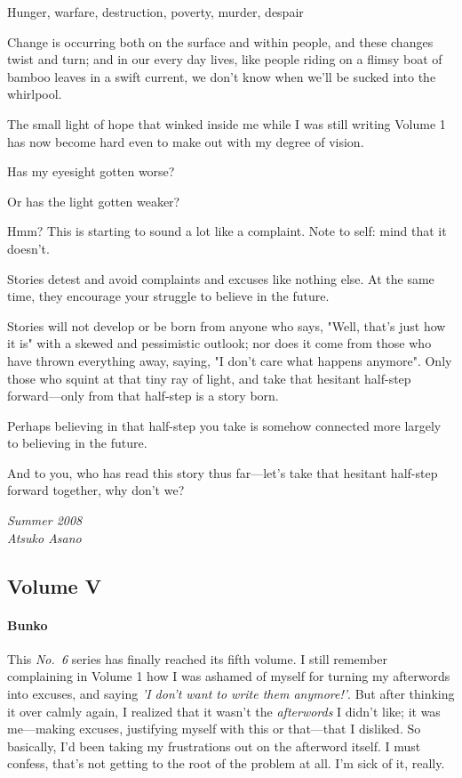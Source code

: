 Hunger, warfare, destruction, poverty, murder, despair\el 

Change is occurring both on the surface and within people, and these
changes twist and turn; and in our every day lives, like people riding
on a flimsy boat of bamboo leaves in a swift current, we don't know when
we'll be sucked into the whirlpool.

The small light of hope that winked inside me while I was still writing
Volume 1 has now become hard even to make out with my degree of vision.

Has my eyesight gotten worse?

Or has the light gotten weaker?

Hmm? This is starting to sound a lot like a complaint. Note to self:
mind that it doesn't.

Stories detest and avoid complaints and excuses like nothing else. At
the same time, they encourage your struggle to believe in the future.

Stories will not develop or be born from anyone who says, "Well, that's
just how it is" with a skewed and pessimistic outlook; nor does it come
from those who have thrown everything away, saying, "I don't care what
happens anymore". Only those who squint at that tiny ray of light, and
take that hesitant half-step forward---only from that half-step is a story
born.

Perhaps believing in that half-step you take is somehow connected more
largely to believing in the future.

And to you, who has read this story thus far---let's take that hesitant
half-step forward together, why don't we?

\myspace

\emph{Summer 2008\\
	Atsuko Asano}

\clearpage
\subsection{Volume V}
\paragraph{Bunko}

This \emph{No.~6} series has finally reached its fifth volume. I still remember
complaining in Volume 1 how I was ashamed of myself for turning my
afterwords into excuses, and saying \emph{'I don't want to write them
anymore!'}. But after thinking it over calmly again, I realized that it
wasn't the \emph{afterwords} I didn't like; it was me---making excuses,
justifying myself with this or that---that I disliked. So basically, I'd
been taking my frustrations out on the afterword itself. I must confess,
that's not getting to the root of the problem at all. I'm sick of it,
really.

